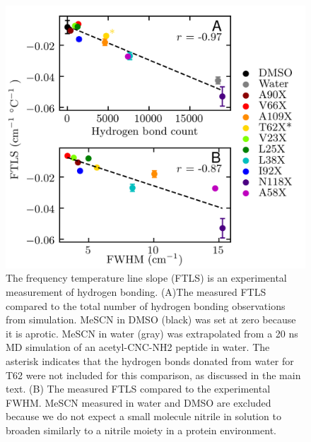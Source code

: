 \begin{figure}
    \center
    \includegraphics[width=\single]{figures-snase/combined_ftls_figures.png}
    \caption[FTLS is an experimental measurement of hydrogen bonding]{
        The frequency temperature line slope (FTLS) is an experimental measurement of hydrogen bonding. 
        (A)The measured FTLS compared to the total number of hydrogen bonding observations from simulation. 
        MeSCN in DMSO (black) was set at zero because it is aprotic. 
        MeSCN in water (gray) was extrapolated from a 20 ns MD simulation of an acetyl-CNC-NH2 peptide in water. 
        The asterisk indicates that the hydrogen bonds donated from water for T62 were not included for this comparison, as discussed in the main text. 
        (B) The measured FTLS compared to the experimental FWHM. 
        MeSCN measured in water and DMSO are excluded because we do not expect a small molecule nitrile in solution to broaden similarly to a nitrile moiety in a protein environment. 
    }
    \label{fig:snase-ftls_vs_others}
\end{figure}

